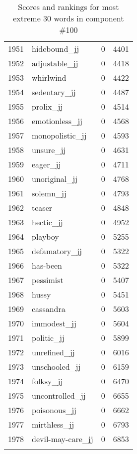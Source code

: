 \begin{longtable}[!htbp]{| rlr@{.}l |}
    1951 & hidebound\_jj & 0 & 4401 \\
    1952 & adjustable\_jj & 0 & 4418 \\
    1953 & whirlwind & 0 & 4422 \\
    1954 & sedentary\_jj & 0 & 4487 \\
    1955 & prolix\_jj & 0 & 4514 \\
    1956 & emotionless\_jj & 0 & 4568 \\
    1957 & monopolistic\_jj & 0 & 4593 \\
    1958 & unsure\_jj & 0 & 4631 \\
    1959 & eager\_jj & 0 & 4711 \\
    1960 & unoriginal\_jj & 0 & 4768 \\
    1961 & solemn\_jj & 0 & 4793 \\
    1962 & teaser & 0 & 4848 \\
    1963 & hectic\_jj & 0 & 4952 \\
    1964 & playboy & 0 & 5255 \\
    1965 & defamatory\_jj & 0 & 5322 \\
    1966 & has-been & 0 & 5322 \\
    1967 & pessimist & 0 & 5407 \\
    1968 & hussy & 0 & 5451 \\
    1969 & cassandra & 0 & 5603 \\
    1970 & immodest\_jj & 0 & 5604 \\
    1971 & politic\_jj & 0 & 5899 \\
    1972 & unrefined\_jj & 0 & 6016 \\
    1973 & unschooled\_jj & 0 & 6159 \\
    1974 & folksy\_jj & 0 & 6470 \\
    1975 & uncontrolled\_jj & 0 & 6655 \\
    1976 & poisonous\_jj & 0 & 6662 \\
    1977 & mirthless\_jj & 0 & 6793 \\
    1978 & devil-may-care\_jj & 0 & 6853 \\
    \hline
    \caption{Scores and rankings for most extreme 30 words in component \#100} \\
\end{longtable}
